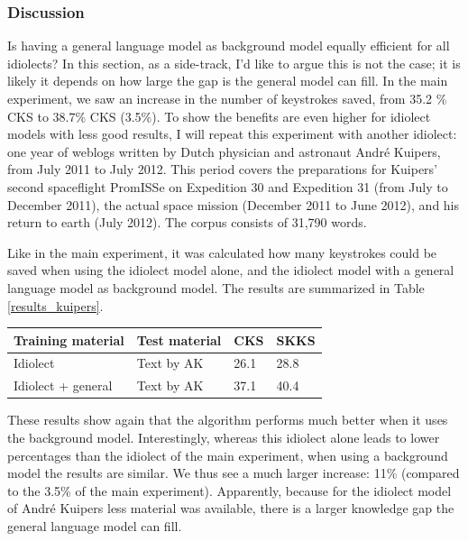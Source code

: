 \documentclass[11pt]{article}
\let\originaltable\table
\let\endoriginaltable\endtable
\renewenvironment{table}[1][ht]{%
  \originaltable[#1]
  \centering}%
  {\endoriginaltable}
\begin{document}
\subsubsection{Discussion} \label{simple_exp_disc}
Is having a general language model as background model equally efficient for all idiolects? In this section, as a side-track, I'd like to argue this is not the case; it is likely it depends on how large the gap is the general model can fill. In the main experiment, we saw an increase in the number of keystrokes saved, from 35.2 \% CKS to 38.7\% CKS (3.5\%). To show the benefits are even higher for idiolect models with less good results, I will repeat this experiment with another idiolect: one year of weblogs written by Dutch physician and astronaut Andr\'e Kuipers, from July 2011 to July 2012. This period covers the preparations for Kuipers' second spaceflight PromISSe on Expedition 30 and Expedition 31 (from July to December 2011), the actual space mission (December 2011 to June 2012), and his return to earth (July 2012). The corpus consists of 31,790 words. 

Like in the main experiment, it was calculated how many keystrokes could be saved when using the idiolect model alone, and the idiolect model with a general language model as background model. The results are summarized in Table \ref{results_kuipers}. 

\begin{table}[H]
\begin{tabular}{ll|ll} 
Training material&Test material&CKS&SKKS\\
\hline
Idiolect&Text by AK&26.1&28.8\\
Idiolect + general&Text by AK&37.1&40.4\\
\end{tabular} 
\caption{Percentage of keystrokes that can be saved when using the idiolect of Andr\'e Kuipers, with and without background model} \label{results_kuipers}
\end{table}

These results show again that the algorithm performs much better when it uses the background model. Interestingly, whereas this idiolect alone leads to lower percentages than the idiolect of the main experiment, when using a background model the results are similar. We thus see a much larger increase: 11\% (compared to the 3.5\% of the main experiment). Apparently, because for the idiolect model of Andr\'e Kuipers less material was available, there is a larger knowledge gap the general language model can fill.
\end{document}
